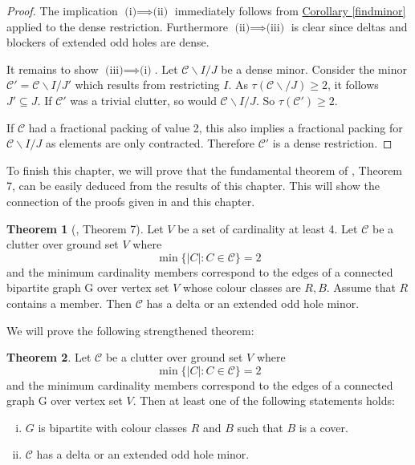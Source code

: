 \documentclass[a4paper, 12pt]{scrbook}
\theoremstyle{definition}
\newtheorem{theorem}{Theorem}[chapter]
\begin{document}
   \begin{proof}
       The implication $\text{(i)} \implies \text{(ii)}$ immediately follows from \hyperref[findminor]{Corollary \ref*{findminor}} applied to the dense restriction. Furthermore $\text{(ii)} \implies \text{(iii)}$ is clear since deltas and blockers of extended odd holes are dense.

       It remains to show $\text{(iii)} \implies \text{(i)}$. Let $\mathcal{C} \backslash I /J$ be a dense minor. Consider the minor $\mathcal{C'}=\mathcal{C}\backslash I/J'$ which results from restricting $I$. As $\tau(\mathcal{C}\backslash /J)\geq 2$, it follows $J' \subseteq J$. If $\mathcal{C'}$ was a trivial clutter, so would $\mathcal{C} \backslash I/J$. So $\tau(\mathcal{C'})\geq 2$.

       If $\mathcal{C}$ had a fractional packing of value 2, this also implies a fractional packing for $\mathcal{C}\backslash I/J$ as elements are only contracted. Therefore $\mathcal{C'}$ is a dense restriction.
   \end{proof}

   To finish this chapter, we will prove that the fundamental theorem of \cite{deltas}, Theorem 7, can be easily deduced from the results of this chapter. This will show the connection of the proofs given in \cite{deltas} and this chapter.

   \begin{theorem}[\cite{deltas}, Theorem 7]
       Let $V$ be a set of cardinality at least 4. Let $\mathcal{C}$ be a clutter over ground set $V$ where
       \[
           \min\{|C|: C \in \mathcal{C}\} = 2
           \]
           and the minimum cardinality members correspond to the edges of a connected bipartite graph G over vertex set $V$ whose colour classes are $R,B$. Assume that $R$ contains a member. Then $\mathcal{C}$ has a delta or an extended odd hole minor.
   \end{theorem}

   We will prove the following strengthened theorem:
   \begin{theorem}
       Let $\mathcal{C}$ be a clutter over ground set $V$ where
       \[
           \min\{|C|: C \in \mathcal{C}\} = 2
           \]
           and the minimum cardinality members correspond to the edges of a connected graph G over vertex set $V$.
           Then at least one of the following statements holds:
           \leavevmode
           \begin{enumerate}[(i)]
               \item $G$ is bipartite with colour classes $R$ and $B$ such that $B$ is a cover.
               \item $\mathcal{C}$ has a delta or an extended odd hole minor.
           \end{enumerate}
    \end{theorem}
\end{document}
